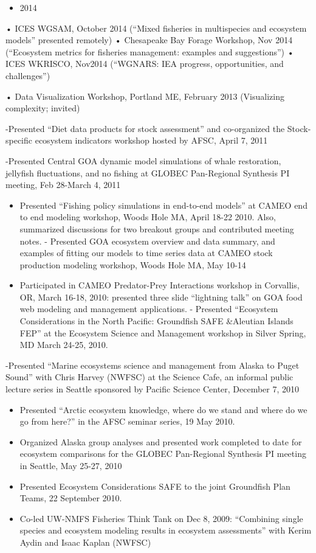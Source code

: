 \documentclass[11pt, a4paper]{awesome-cv}
\providecommand{\tightlist}{%
	\setlength{\itemsep}{0pt}\setlength{\parskip}{0pt}}
\begin{document}
\begin{itemize}
\tightlist
\item
  2014
\end{itemize}

• ICES WGSAM, October 2014 (``Mixed fisheries in multispecies and
ecosystem models'' presented remotely) • Chesapeake Bay Forage Workshop,
Nov 2014 (``Ecosystem metrics for fisheries management: examples and
suggestions'') • ICES WKRISCO, Nov2014 (``WGNARS: IEA progress,
opportunities, and challenges'')

• Data Visualization Workshop, Portland ME, February 2013 (Visualizing
complexity; invited)

-Presented ``Diet data products for stock assessment'' and co-organized
the Stock-specific ecosystem indicators workshop hosted by AFSC, April
7, 2011

-Presented Central GOA dynamic model simulations of whale restoration,
jellyfish fluctuations, and no fishing at GLOBEC Pan-Regional Synthesis
PI meeting, Feb 28-March 4, 2011

\begin{itemize}
\item
  Presented ``Fishing policy simulations in end-to-end models'' at CAMEO
  end to end modeling workshop, Woods Hole MA, April 18-22 2010. Also,
  summarized discussions for two breakout groups and contributed meeting
  notes. - Presented GOA ecosystem overview and data summary, and
  examples of fitting our models to time series data at CAMEO stock
  production modeling workshop, Woods Hole MA, May 10-14
\item
  Participated in CAMEO Predator-Prey Interactions workshop in
  Corvallis, OR, March 16-18, 2010: presented three slide ``lightning
  talk'' on GOA food web modeling and management applications. -
  Presented ``Ecosystem Considerations in the North Pacific: Groundfish
  SAFE \&Aleutian Islands FEP'' at the Ecosystem Science and Management
  workshop in Silver Spring, MD March 24-25, 2010.
\end{itemize}

-Presented ``Marine ecosystems science and management from Alaska to
Puget Sound'' with Chris Harvey (NWFSC) at the Science Cafe, an informal
public lecture series in Seattle sponsored by Pacific Science Center,
December 7, 2010

\begin{itemize}
\item
  Presented ``Arctic ecosystem knowledge, where do we stand and where do
  we go from here?'' in the AFSC seminar series, 19 May 2010.
\item
  Organized Alaska group analyses and presented work completed to date
  for ecosystem comparisons for the GLOBEC Pan-Regional Synthesis PI
  meeting in Seattle, May 25-27, 2010
\item
  Presented Ecosystem Considerations SAFE to the joint Groundfish Plan
  Teams, 22 September 2010.
\item
  Co-led UW-NMFS Fisheries Think Tank on Dec 8, 2009: ``Combining single
  species and ecosystem modeling results in ecosystem assessments'' with
  Kerim Aydin and Isaac Kaplan (NWFSC)
\end{itemize}
\end{document}
